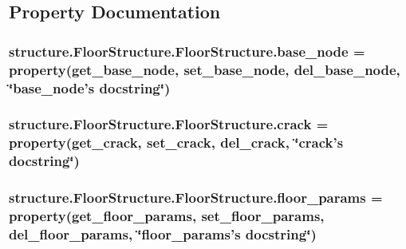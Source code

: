 \subsection{Property Documentation}
\hypertarget{classstructure_1_1_floor_structure_1_1_floor_structure_a04d9c9c992e2b8b3301b12f2942a68d2}{
\subsubsection[{base\-\_\-node}]{\setlength{\rightskip}{0pt plus 5cm}structure.\-Floor\-Structure.\-Floor\-Structure.\-base\-\_\-node = property({\bf get\-\_\-base\-\_\-node}, {\bf set\-\_\-base\-\_\-node}, {\bf del\-\_\-base\-\_\-node}, \char`\"{}base\-\_\-node's docstring\char`\"{})\hspace{0.3cm}{\ttfamily [static]}}}\label{classstructure_1_1_floor_structure_1_1_floor_structure_a04d9c9c992e2b8b3301b12f2942a68d2}
\hypertarget{classstructure_1_1_floor_structure_1_1_floor_structure_a6b36081187252a7b4041e76c13b956d2}{
\subsubsection[{crack}]{\setlength{\rightskip}{0pt plus 5cm}structure.\-Floor\-Structure.\-Floor\-Structure.\-crack = property({\bf get\-\_\-crack}, {\bf set\-\_\-crack}, {\bf del\-\_\-crack}, \char`\"{}crack's docstring\char`\"{})\hspace{0.3cm}{\ttfamily [static]}}}\label{classstructure_1_1_floor_structure_1_1_floor_structure_a6b36081187252a7b4041e76c13b956d2}
\hypertarget{classstructure_1_1_floor_structure_1_1_floor_structure_aad58222fb8f971e929db5c0816a34e60}{
\subsubsection[{floor\-\_\-params}]{\setlength{\rightskip}{0pt plus 5cm}structure.\-Floor\-Structure.\-Floor\-Structure.\-floor\-\_\-params = property({\bf get\-\_\-floor\-\_\-params}, {\bf set\-\_\-floor\-\_\-params}, {\bf del\-\_\-floor\-\_\-params}, \char`\"{}floor\-\_\-params's docstring\char`\"{})\hspace{0.3cm}{\ttfamily [static]}}}\label{classstructure_1_1_floor_structure_1_1_floor_structure_aad58222fb8f971e929db5c0816a34e60}
